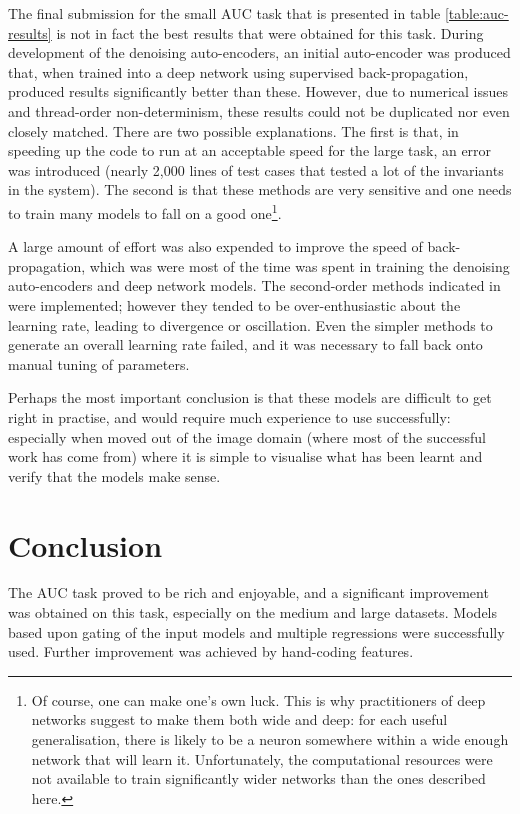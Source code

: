 \documentclass{article}
\begin{document}
The final submission for the small AUC task that is presented in table \ref{table:auc-results} is not in fact the best results that were obtained for this task.  During development of the denoising auto-encoders, an initial auto-encoder was produced that, when trained into a deep network using supervised back-propagation, produced results significantly better than these.  However, due to numerical issues and thread-order non-determinism, these results could not be duplicated nor even closely matched.  There are two possible explanations.  The first is that, in speeding up the code to run at an acceptable speed for the large task, an error was introduced (nearly 2,000 lines of test cases that tested a lot of the invariants in the system).  The second is that these methods are very sensitive and one needs to train many models to fall on a good one\footnote{Of course, one can make one's own luck.  This is why practitioners of deep networks suggest to make them both wide and deep: for each useful generalisation, there is likely to be a neuron somewhere within a wide enough network that will learn it.  Unfortunately, the computational resources were not available to train significantly wider networks than the ones described here.}.

A large amount of effort was also expended to improve the speed of back-propagation, which was were most of the time was spent in training the denoising auto-encoders and deep network models.  The second-order methods indicated in \cite{lecun-98b} were implemented; however they tended to be over-enthusiastic about the learning rate, leading to divergence or oscillation.  Even the simpler methods to generate an overall learning rate failed, and it was necessary to fall back onto manual tuning of parameters.

Perhaps the most important conclusion is that these models are difficult to get right in practise, and would require much experience to use successfully: especially when moved out of the image domain (where most of the successful work has come from) where it is simple to visualise what has been learnt and verify that the models make sense.

\section{Conclusion}

The AUC task proved to be rich and enjoyable, and a significant improvement was obtained on this task, especially on the medium and large datasets.  Models based upon gating of the input models and multiple regressions were successfully used.  Further improvement was achieved by hand-coding features.
\end{document}
